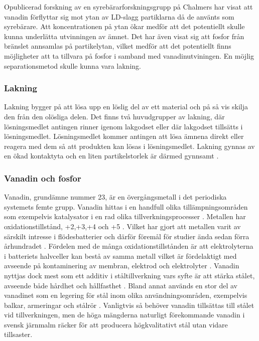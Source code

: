 Opublicerad forskning av en syrebärarforskningsgrupp på Chalmers har visat att vanadin förflyttar sig mot ytan av LD-slagg partiklarna då de använts som syrebärare. Att koncentrationen på ytan ökar medför att det potentiellt skulle kunna underlätta utvinningen av ämnet. Det har även visat sig att fosfor från bränslet annsamlas på partikelytan, vilket medför att det potentiellt finns möjligheter att ta tillvara på fosfor i samband med vanadinutviningen. En möjlig separationsmetod skulle kunna vara lakning.

\subsubsection{Lakning}

Lakning bygger på att lösa upp en löslig del av ett material och på så vis skilja den från den olösliga delen. Det finns två huvudgrupper av lakning, där lösningsmedlet antingen rinner igenom lakgodset eller där lakgodset tillsätts i lösningsmedlet. Lösningsmedlet kommer antingen att lösa ämnena direkt eller reagera med dem så att produkten kan lösas i lösningsmedlet. Lakning gynnas av en ökad kontaktyta och en liten partikelstorlek är därmed gynnsamt \cite{lakning}. 




\subsubsection{Vanadin och fosfor}

Vanadin, grundämne nummer 23, är en övergångsmetall i det periodiska systemets femte grupp. Vanadin hittas i en handfull olika tillämpningsområden som exempelvis katalysator i en rad olika tillverkningsprocesser \cite{Pecoraro2014}.
Metallen har oxidationstillstånd, +2,+3,+4 och +5 \cite{Baroch2013}. Vilket har gjort att metallen varit av särskilt intresse i flödesbatterier och därför föremål för studier ända sedan förra århundradet \cite{Skyllas-Kazacos1987}.
Fördelen med de många oxidationstillstånden är att elektrolyterna i batteriets halvceller kan bestå av samma metall vilket är fördelaktigt med avseende på kontaminering av membran, elektrod och elektrolyter 
\cite{Lopez-Vizcaino2017}. Vanadin nyttjas dock mest som ett additiv i ståltillverkning vars syfte är att stärka stålet, avseende både hårdhet och hållfasthet \cite{Baroch2013}. Bland annat används en stor del av vanadinet som en legering för stål inom olika användningsområden, exempelvis balkar, armeringar och stålrör \cite{Pecoraro2014}. Vanligtvis så behöver vanadin tillsättas till stålet vid tillverkningen, men de höga mängderna naturligt förekommande vanadin i svensk järnmalm räcker för att producera högkvalitativt stål utan vidare tillsaster. 

